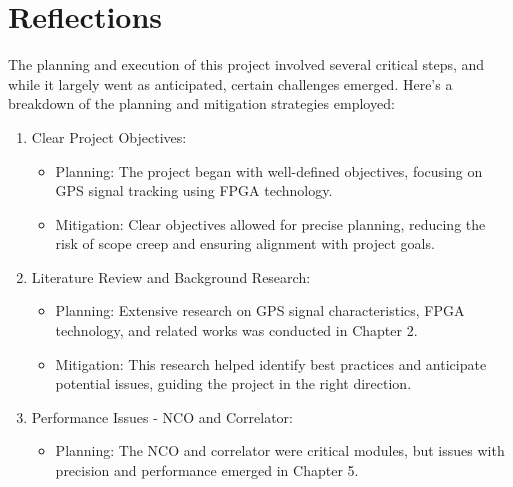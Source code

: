 \section{Reflections}
The planning and execution of this project involved several critical steps, and while it largely went as anticipated, certain challenges emerged. Here's a breakdown of the planning and mitigation strategies employed:
\begin{enumerate}

    \item Clear Project Objectives:
    \begin{itemize}
        \item Planning: The project began with well-defined objectives, focusing on GPS signal tracking using FPGA technology.
        \item Mitigation: Clear objectives allowed for precise planning, reducing the risk of scope creep and ensuring alignment with project goals.
    \end{itemize}
    \item Literature Review and Background Research:
    \begin{itemize}
        \item Planning: Extensive research on GPS signal characteristics, FPGA technology, and related works was conducted in Chapter 2.
        \item Mitigation: This research helped identify best practices and anticipate potential issues, guiding the project in the right direction.
    \end{itemize}
    \item Performance Issues - NCO and Correlator:
    \begin{itemize}
        \item Planning: The NCO and correlator were critical modules, but issues with precision and performance emerged in Chapter 5.

\end{itemize}
\end{enumerate}
